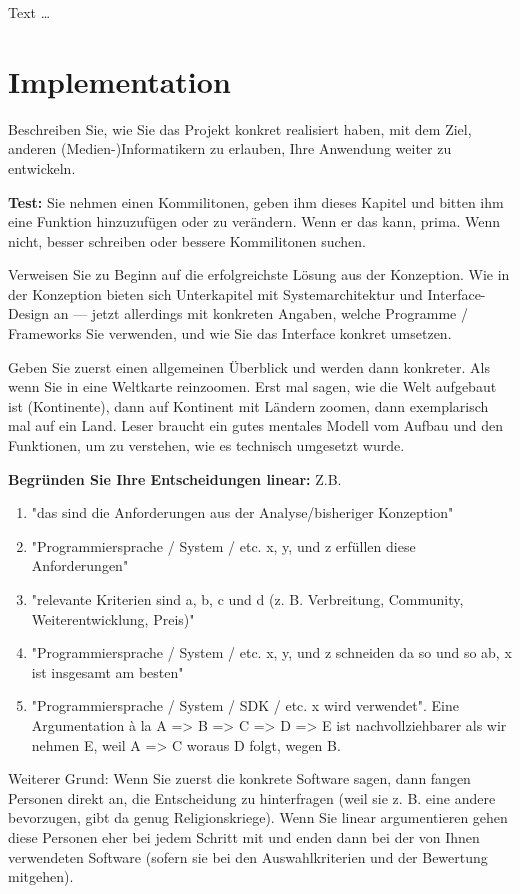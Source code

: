 \documentclass[11pt,a4paper,english]{scrreprt}
\newenvironment{comment}
  {\par\medskip
   \begingroup\color{olive}%
   }
 {\endgroup
  \medskip}
\begin{document}
Text \dots

\newpage
\chapter{Implementation}
\begin{comment}
Beschreiben Sie, wie Sie das Projekt konkret realisiert haben, mit dem Ziel, anderen (Medien-)Informatikern zu erlauben, Ihre Anwendung weiter zu entwickeln.

\textbf{Test:} Sie nehmen einen Kommilitonen, geben ihm dieses Kapitel und bitten ihm eine Funktion hinzuzufügen oder zu verändern. Wenn er das kann, prima. Wenn nicht, besser schreiben oder bessere Kommilitonen suchen.

Verweisen Sie zu Beginn auf die erfolgreichste Lösung aus der Konzeption. Wie in der Konzeption bieten sich Unterkapitel mit Systemarchitektur und Interface-Design an — jetzt allerdings mit konkreten Angaben, welche Programme / Frameworks Sie verwenden, und wie Sie das Interface konkret umsetzen.

Geben Sie zuerst einen allgemeinen Überblick und werden dann konkreter. Als wenn Sie in eine Weltkarte reinzoomen. Erst mal sagen, wie die Welt aufgebaut ist (Kontinente), dann auf Kontinent mit Ländern zoomen, dann exemplarisch mal auf ein Land. Leser braucht ein gutes mentales Modell vom Aufbau und den Funktionen, um zu verstehen, wie es technisch umgesetzt wurde.

\textbf{Begründen Sie Ihre Entscheidungen linear:} Z.B.

\begin{enumerate}
    \item "das sind die Anforderungen aus der Analyse/bisheriger Konzeption"
    \item "Programmiersprache / System / etc. x, y, und z erfüllen diese Anforderungen"
    \item "relevante Kriterien sind a, b, c und d (z. B. Verbreitung, Community, Weiterentwicklung, Preis)"
    \item "Programmiersprache / System / etc. x, y, und z schneiden da so und so ab, x ist insgesamt am besten"
    \item "Programmiersprache / System / SDK / etc. x wird verwendet". Eine Argumentation à la A => B => C => D => E ist nachvollziehbarer als wir nehmen E, weil A => C woraus D folgt, wegen B.
\end{enumerate}

Weiterer Grund: Wenn Sie zuerst die konkrete Software sagen, dann fangen Personen direkt an, die Entscheidung zu hinterfragen (weil sie z. B. eine andere bevorzugen, gibt da genug Religionskriege). Wenn Sie linear argumentieren gehen diese Personen eher bei jedem Schritt mit und enden dann bei der von Ihnen verwendeten Software (sofern sie bei den Auswahlkriterien und der Bewertung mitgehen).


\end{comment}
\end{document}
